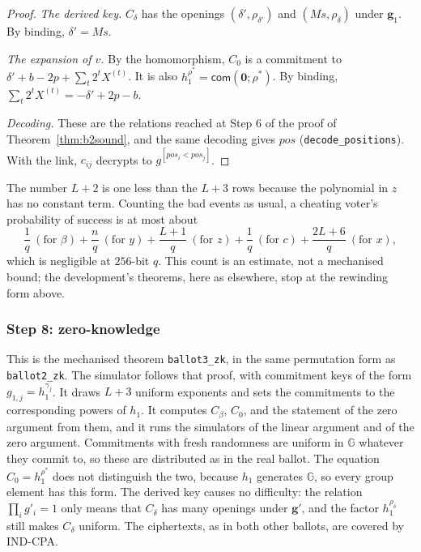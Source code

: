 \documentclass[11pt,a4paper]{article}
\newcommand{\G}{\mathbb{G}}
\newcommand{\com}{\mathsf{com}}
\newcommand{\pos}{\mathit{pos}}
\newcommand{\rocq}[1]{\texttt{#1}}
\theoremstyle{remark}
\begin{document}
\begin{proof}
\emph{The derived key.} $C_\delta$ has the openings $(\delta',
\rho_{\delta'})$ and $(Ms, \rho_\delta)$ under $\mathbf{g}_1$. By binding,
$\delta' = Ms$.

\emph{The expansion of $v$.} By the homomorphism, $C_0$ is a commitment to
$\delta' + b - 2p + \sum_t 2^{t} X^{(t)}$. It is also $h_1^{\rho^*} =
\com(\mathbf{0}; \rho^*)$. By binding, $\sum_t 2^{t} X^{(t)} = -\delta' + 2p
- b$.

\emph{Decoding.} These are the relations reached at Step 6 of the proof of
Theorem~\ref{thm:b2sound}, and the same decoding gives $\pos$
(\rocq{decode\_positions}). With the link, $c_{ij}$ decrypts to
$g^{[\pos_i < \pos_j]}$.
\end{proof}

The number $L + 2$ is one less than the $L + 3$ rows because the polynomial
in $z$ has no constant term. Counting the bad events as usual, a cheating
voter's probability of success is at most about
\[
  \frac{1}{q} \ (\text{for } \beta) + \frac{n}{q} \ (\text{for } y)
  + \frac{L + 1}{q} \ (\text{for } z) + \frac{1}{q} \ (\text{for } c) +
  \frac{2L + 6}{q} \ (\text{for } x),
\]
which is negligible at $256$-bit $q$. This count is an estimate, not a
mechanised bound; the development's theorems, here as elsewhere, stop at
the rewinding form above.

\subsubsection*{Step 8: zero-knowledge}
This is the mechanised theorem \rocq{ballot3\_zk}, in the same
permutation form as \rocq{ballot2\_zk}. The simulator follows that proof, with commitment keys
of the form $g_{1,j} = h_1^{\gamma_j}$. It draws $L + 3$ uniform exponents
and sets the commitments to the corresponding powers of $h_1$. It computes
$C_\beta$, $C_0$, and the statement of the zero argument from them, and it
runs the simulators of the linear argument and of the zero argument.
Commitments with fresh randomness are uniform in $\G$ whatever they commit
to, so these are distributed as in the real ballot. The equation $C_0 =
h_1^{\rho^*}$ does not distinguish the two, because $h_1$ generates $\G$,
so every group element has this form. The derived key causes no difficulty:
the relation $\prod_i g'_i = 1$ only means that $C_\delta$ has many openings
under $\mathbf{g}'$, and the factor $h_1^{\rho_\delta}$ still makes
$C_\delta$ uniform.
The ciphertexts, as in both other ballots, are covered by IND-CPA.
\end{document}
